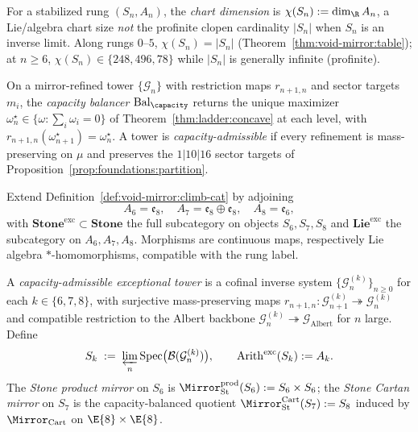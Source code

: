 \begin{definition}\label{def:ladder:chart-dim}
For a stabilized rung $(S_n,A_n)$, the \emph{chart dimension} is
$\chi(S_n):=\dim_{\R}A_n$, a Lie/algebra chart size \emph{not} the profinite
clopen cardinality $|S_n|$ when $S_n$ is an inverse limit. Along rungs
$0$--$5$, $\chi(S_n)=|S_n|$ (Theorem~\ref{thm:void-mirror:table}); at
$n\geq6$, $\chi(S_n)\in\{248,496,78\}$ while $|S_n|$ is generally infinite
(profinite).
\end{definition}

\begin{definition}\label{def:ladder:bal-capacity}
On a mirror-refined tower $\{\mathcal{G}_n\}$ with restriction maps
$r_{n+1,n}$ and sector targets $m_i$, the \emph{capacity balancer}
$\mathrm{Bal}_\capacity$ returns the unique maximizer
$\omega^\star_n\in\{\omega:\sum_i\omega_i=0\}$ of
Theorem~\ref{thm:ladder:concave} at each level, with
$r_{n+1,n}(\omega^\star_{n+1})=\omega^\star_n$. A tower is
\emph{capacity-admissible} if every refinement is mass-preserving on $\mu$ and
preserves the $1|10|16$ sector targets of
Proposition~\ref{prop:foundations:partition}.
\end{definition}

\begin{definition}\label{def:ladder:exc-climb}
Extend Definition~\ref{def:void-mirror:climb-cat} by adjoining
\[
  A_6=\mathfrak{e}_8,\quad
  A_7=\mathfrak{e}_8\oplus\mathfrak{e}_8,\quad
  A_8=\mathfrak{e}_6,
\]
with $\mathbf{Stone}^{\mathrm{exc}}\subset\mathbf{Stone}$ the full subcategory
on objects $S_6,S_7,S_8$ and
$\mathbf{Lie}^{\mathrm{exc}}$ the subcategory on $A_6,A_7,A_8$. Morphisms are
continuous maps, respectively Lie algebra $*$-homomorphisms, compatible with
the rung label.
\end{definition}

\begin{definition}\label{def:ladder:stone-lift-exc}
A \emph{capacity-admissible exceptional tower} is a cofinal inverse system
$\{\mathcal{G}_n^{(k)}\}_{n\geq0}$ for each $k\in\{6,7,8\}$, with
surjective mass-preserving maps
$r_{n+1,n}:\mathcal{G}_{n+1}^{(k)}\twoheadrightarrow\mathcal{G}_n^{(k)}$ and
compatible restriction to the Albert backbone
$\mathcal{G}_n^{(k)}\twoheadrightarrow\mathcal{G}_{\mathrm{Albert}}$ for
$n$ large. Define
\begin{equation}\label{eq:ladder:stone-exc}
  S_k\;:=\;\varprojlim_n\mathrm{Spec}\bigl(\mathcal{B}(\mathcal{G}_n^{(k)})\bigr),
  \qquad
  \mathrm{Arith}^{\mathrm{exc}}(S_k):=A_k.
\end{equation}
The \emph{Stone product mirror} on $S_6$ is
$\Mirror_{\mathrm{St}}^{\mathrm{prod}}(S_6):=S_6\times S_6$; the
\emph{Stone Cartan mirror} on $S_7$ is the capacity-balanced quotient
$\Mirror_{\mathrm{St}}^{\mathrm{Cart}}(S_7):=S_8$ induced by
$\Mirror_{\mathrm{Cart}}$ on $\E{8}\times\E{8}$.
\end{definition}

